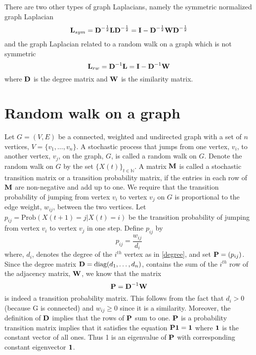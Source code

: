 There are two other types of graph Laplacians, namely the symmetric normalized
graph Laplacian 
\begin{equation}\label{normalizedLaplacian}
\textbf{L}_{sym} = \textbf{D}^{-\frac{1}{2}} \textbf{L} \textbf{D}^{-\frac{1}{2}} =
\textbf{I} - \textbf{D}^{-\frac{1}{2}} \textbf{W} \textbf{D}^{-\frac{1}{2}}
\end{equation}
and 
the graph Laplacian related to a random walk on a graph which is not symmetric
\begin{equation}\label{RandomWalk}
\textbf{L}_{rw} = \textbf{D}^{-1}\textbf{L} = \textbf{I} - \textbf{D}^{-1}\textbf{W}
\end{equation}
where $\textbf{D}$ is the degree matrix and $\textbf{W}$ is the similarity matrix.\\



\section{Random walk on a graph}\label{random walk}
Let $G=(V,E)$ be a connected, weighted and undirected graph with a set of $n$ vertices, $V = \{v_{1}, \dots, v_{n} \}$.
A stochastic process that jumps from one vertex, $v_{i}$, to another vertex, $v_{j}$, on the graph, $G$, is called a random walk on $G$.
Denote the random walk on $G$ by the set $\{X(t)\}_{t \in \mathbb{N}}$.
A matrix $\textbf{M}$ is called a stochastic transition matrix or a transition probability matrix, if the entries in each row of $\textbf{M}$ are non-negative and add up to one.
We require that the transition probability of jumping from vertex $v_{i}$
to vertex $v_{j}$ on $G$ is proportional to the edge weight, $w_{ij}$, between the two vertices. 
Let $p_{ij} = \text{Prob} \left(X(t+1) = j | X(t) = i \right)$ be the transition probability of jumping from vertex $v_{i}$ to vertex $v_{j}$ in one step. Define $p_{ij}$ by
\begin{equation}
p_{ij}   = \frac{w_{ij}}{d_{i}}
\end{equation}
where, $d_{i}$,  denotes the degree of the $i^{th}$ vertex as in \eqref{degree}, and 
set $\textbf{P} = (p_{ij})$. Since the degree matrix $\textbf{D} = \text{diag}(d_{1}, \ldots, d_{n})$, contains the sum of the $i^{th}$ row of the adjacency matrix, $\textbf{W}$,
we know that the matrix 
\begin{equation}\label{transitmatrix}
\textbf{P} = \textbf{D}^{-1}\textbf{W} 
\end{equation}
is indeed a transition probability matrix. This follows from the fact that $d_{i} > 0$ (because G is connected) and $w_{ij} \geq 0$ since it is a similarity. Moreover, the definition of $\textbf{D}$ implies that the rows of $\textbf{P}$ sum to one. 
$\textbf{P}$ is a probability transition matrix implies that it satisfies
the equation $\textbf{P} \boldsymbol{1} = \boldsymbol{1}$ where $\boldsymbol{1}$ is the constant vector of all ones. Thus 1 is an eigenvalue of $\textbf{P}$ with corresponding constant eigenvector $\boldsymbol{1}$.

